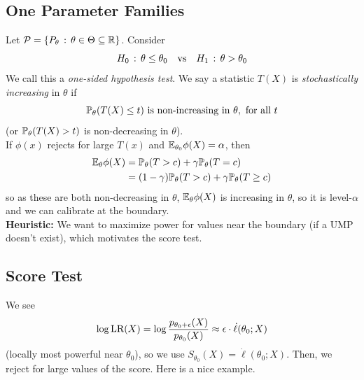 
\subsection*{One Parameter Families}
\sectionspace

Let $\cal{P} = \{P_{\theta} \col \theta \in \Theta \subseteq \R\}$. Consider
\[ H_0 \col \theta \leq \theta_0 \quad \tt{vs} \quad H_1 \col \theta > \theta_0 \]
We call this a \emph{one-sided hypothesis test}. We say a statistic $T(X)$ is \emph{stochastically increasing} in $\theta$ if
\[ \bb{P}_{\theta}(T(X) \leq t) \tt{ is non-increasing in } \theta, \tt{ for all } t \]
(or $\bb{P}_{\theta}(T(X) > t)$ is non-decreasing in $\theta$).\\


If $\phi(x)$ rejects for large $T(x)$ and $\E_{\theta_0}\phi(X) = \alpha$, then
\begin{align*}
    \E_{\theta}\phi(X) &= \bb{P}_{\theta}(T > c) + \gamma\bb{P}_{\theta}(T = c)\\
    &= (1 - \gamma)\bb{P}_{\theta}(T > c) + \gamma\bb{P}_{\theta}(T \geq c)
\end{align*}
so as these are both non-decreasing in $\theta$, $\E_{\theta}\phi(X)$ is increasing in $\theta$, so it is level-$\alpha$ and we can calibrate at the boundary.\\

\textbf{Heuristic:} We want to maximize power for values near the boundary (if a UMP doesn't exist), which motivates the score test.

\subsection*{Score Test}
\sectionspace

We see
\[ \log\tt{LR}(X) = \log\frac{p_{\theta_0 + \epsilon}(X)}{p_{\theta_0}(X)} \approx \epsilon \cdot \dot{\ell}(\theta_0; X) \]
(locally most powerful near $\theta_0$), so we use $S_{\theta_0}(X) = \dot{\ell}(\theta_0; X)$. Then, we reject for large values of the score. Here is a nice example.

